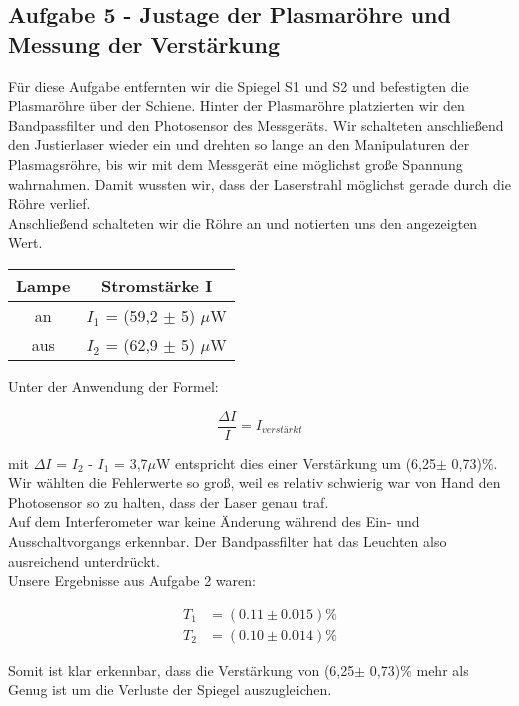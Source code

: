 \subsection{Aufgabe 5 - Justage der Plasmaröhre und Messung der Verstärkung}

Für diese Aufgabe entfernten wir die Spiegel S1 und S2 und befestigten die Plasmaröhre über der Schiene. Hinter der Plasmaröhre platzierten wir den Bandpassfilter und den Photosensor des Messgeräts. Wir schalteten anschließend den Justierlaser wieder ein und drehten so lange an den Manipulaturen der Plasmagsröhre, bis wir mit dem Messgerät eine möglichst große Spannung wahrnahmen. Damit wussten wir, dass der Laserstrahl möglichst gerade durch die Röhre verlief.\\
Anschließend schalteten wir die Röhre an und notierten uns den angezeigten Wert.\\

\begin{center}
\begin{tabular}{c | c}
Lampe & Stromstärke I\\
\hline
an & $I_1$ = (59,2 $\pm$ 5) $\mu$W\\
aus & $I_2$ = (62,9 $\pm$ 5) $\mu$W
\end{tabular}
\end{center}

Unter der Anwendung der Formel:

\begin{equation}
\frac{\Delta I}{I} = I_{verstärkt}
\end{equation}

mit $\Delta I$ = $I_2$ - $I_1$ = 3,7$\mu$W entspricht dies einer Verstärkung um (6,25$\pm$ 0,73)$\%$. Wir wählten die Fehlerwerte so groß, weil es relativ schwierig war von Hand den Photosensor so zu halten, dass der Laser genau traf.\\
Auf dem Interferometer war keine Änderung während des Ein- und Ausschaltvorgangs erkennbar. Der Bandpassfilter hat das Leuchten also ausreichend unterdrückt.\\
Unsere Ergebnisse aus Aufgabe 2 waren:

\begin{align*}
	T_{1} &= (0.11 \pm 0.015)\% \\
	T_{2} &= (0.10 \pm 0.014)\% 
\end{align*}

Somit ist klar erkennbar, dass die Verstärkung von (6,25$\pm$ 0,73)$\%$ mehr als Genug ist um die Verluste der Spiegel auszugleichen.